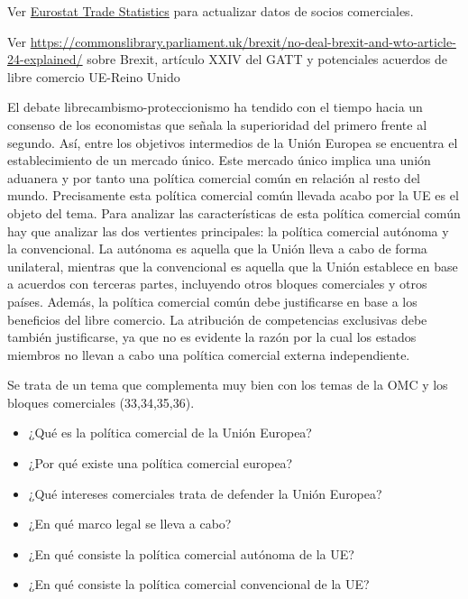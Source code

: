 \documentclass{nuevotema}
\begin{document}
\ideaclave


Ver \href{https://ec.europa.eu/trade/policy/eu-position-in-world-trade/statistics/}{Eurostat Trade Statistics} para actualizar datos de socios comerciales.


Ver \url{https://commonslibrary.parliament.uk/brexit/no-deal-brexit-and-wto-article-24-explained/} sobre Brexit, artículo XXIV del GATT y potenciales acuerdos de libre comercio UE-Reino Unido

El debate librecambismo-proteccionismo ha tendido con el tiempo hacia un consenso de los economistas que señala la superioridad del primero frente al segundo. Así, entre los objetivos intermedios de la Unión Europea se encuentra el establecimiento de un mercado único. Este mercado único implica una unión aduanera y por tanto una política comercial común en relación al resto del mundo. Precisamente esta política comercial común llevada acabo por la UE es el objeto del tema. Para analizar las características de esta política comercial común hay que analizar las dos vertientes principales: la política comercial autónoma y la convencional. La autónoma es aquella que la Unión lleva a cabo de forma unilateral, mientras que la convencional es aquella que la Unión establece en base a acuerdos con terceras partes, incluyendo otros bloques comerciales y otros países. Además, la política comercial común debe justificarse en base a los beneficios del libre comercio. La atribución de competencias exclusivas debe también justificarse, ya que no es evidente la razón por la cual los estados miembros no llevan a cabo una política comercial externa independiente.

Se trata de un tema que complementa muy bien con los temas de la OMC y los bloques comerciales (33,34,35,36).

\begin{itemize}
	\item ¿Qué es la política comercial de la Unión Europea?
	\item ¿Por qué existe una política comercial europea?
	\item ¿Qué intereses comerciales trata de defender la Unión Europea?
	\item ¿En qué marco legal se lleva a cabo?
	\item ¿En qué consiste la política comercial autónoma de la UE?
	\item ¿En qué consiste la política comercial convencional de la UE?
\end{itemize}


\esquemacorto
\end{document}
